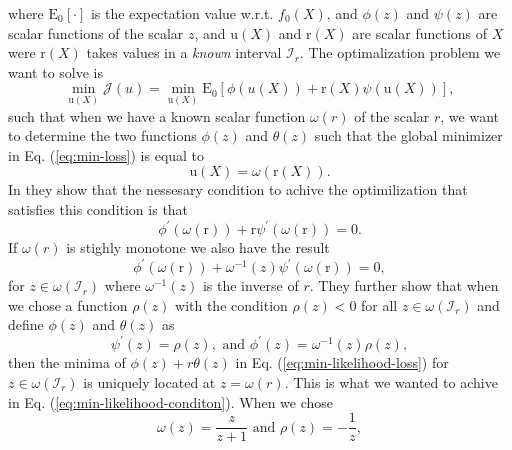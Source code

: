 \documentclass[../../main/main.tex]{subfiles}
\begin{document}
where \(\mathrm{E_0[\cdot]}\) is the expectation value w.r.t. \(f_0(X)\), and \(\phi(z)\) and \(\psi(z)\) are scalar functions of the scalar \(z\), and \(\mathrm{u}(X)\) and \(\mathrm{r}(X)\) are scalar functions of \(X\) were \(\mathrm{r}(X)\) takes values in a \emph{known} interval \(\mathcal{I}_r\). The optimalization problem we want to solve is
\begin{equation}
  \label{eq:min-likelihood-loss}
  \min_{\mathrm{u}(X)} \mathcal{J}(u) = \min_{\mathrm{u}(X)} \mathrm{E_0}[\phi(u(X)) + \mathrm{r}(X)\psi(\mathrm{u}(X))],
\end{equation}
such that when we have a known scalar function \(\omega(r)\) of the scalar \(r\), we want to determine the two functions \(\phi(z)\) and \(\theta(z)\) such that the global minimizer in Eq. (\ref{eq:min-loss}) is equal to
\begin{equation}
  \label{eq:min-likelihood-conditon}
  \mathrm{u}(X) = \omega(\mathrm{r}(X)).
\end{equation}
In \cite{moustakides2019training} they show that the nessesary condition to achive the optimilization that satisfies this condition is that
\begin{equation}
  \label{eq:likelihood-condition-1}
  \phi^\prime(\omega(\mathrm{r}))+ \mathrm{r} \psi^\prime(\omega(\mathrm{r})) = 0.
\end{equation}
If \(\omega(r)\) is stighly monotone we also have the result
\begin{equation}
  \label{eq:likelihood-condition-stright}
  \phi^\prime(\omega(\mathrm{r}))+ \omega^{-1}(z) \psi^\prime(\omega(\mathrm{r})) = 0,
\end{equation}
for \(z\in\omega(\mathcal{I}_r)\) where \(\omega^{-1}(z)\) is the inverse of \(r\).
They further show that when we chose a function \(\rho(z)\) with the condition \(\rho(z) < 0\) for all \(z \in \omega(\mathcal{I}_r)\) and define \(\phi(z)\) and \(\theta(z)\) as
\begin{equation}
  \label{eq:likelihood-rhp}
  \psi^\prime(z) = \rho(z), \text{ and } \phi^\prime(z) = \omega^{-1}(z)\rho(z),
\end{equation}
then the minima of \(\phi(z) + r\theta(z)\) in Eq. (\ref{eq:min-likelihood-loss}) for \(z\in\omega(\mathcal{I}_r)\) is uniquely located at \(z = \omega(r)\). This is what we wanted to achive in Eq. (\ref{eq:min-likelihood-conditon}). When we chose
\begin{equation}
  \label{eq:4}
  \omega(z) = \frac{z}{z+1} \text{ and } \rho(z) = -\frac{1}{z}, 
\end{equation}
\end{document}
